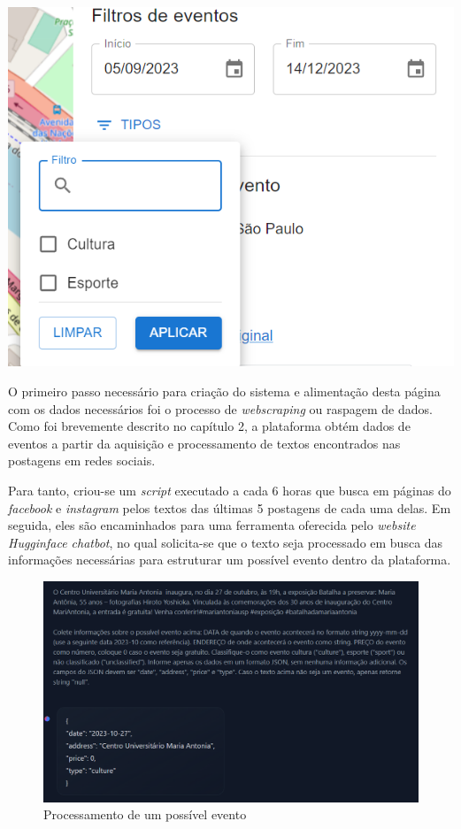 \begin{multicols}{2}
    \vspace*{\fill}
    \includegraphics[width=.99\linewidth]{figuras/filtro_eventos.png}
    \vspace*{\fill}
\end{multicols}

O primeiro passo necessário para criação do sistema e alimentação desta página
com os dados necessários foi o processo de \textit{webscraping} ou raspagem de
dados. Como foi brevemente descrito no capítulo 2, a plataforma obtém dados de
eventos a partir da aquisição e processamento de textos encontrados nas
postagens em redes sociais.

Para tanto, criou-se um \textit{script} executado a cada 6 horas que busca em
páginas do \textit{facebook} e \textit{instagram} pelos textos das últimas 5
postagens de cada uma delas. Em seguida, eles são encaminhados para uma
ferramenta oferecida pelo \textit{website} \textit{Hugginface chatbot}, no qual
solicita-se que o texto seja processado em busca das informações necessárias
para estruturar um possível evento dentro da plataforma.

\begin{figure}[h]
    \centering
    \includegraphics[width=1\textwidth]{figuras/huggingface-chatbot.png}
    \caption{Processamento de um possível evento}
    \label{fig:enter-label}
\end{figure}

